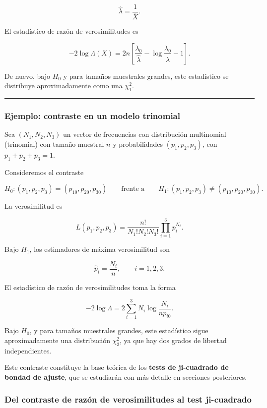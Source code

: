 \documentclass[
]{article}
\begin{document}
\[
\hat\lambda=\frac{1}{\bar X}.
\]

El estadístico de razón de verosimilitudes es

\[
-2\log\Lambda(X)
=
2n\left[
\frac{\lambda_0}{\hat\lambda}
-\log\frac{\lambda_0}{\hat\lambda}
-1
\right].
\]

De nuevo, bajo \(H_0\) y para tamaños muestrales grandes, este estadístico se distribuye aproximadamente como una \(\chi^2_1\).

\begin{center}\rule{0.5\linewidth}{0.5pt}\end{center}

\subsubsection{Ejemplo: contraste en un modelo trinomial}\label{ejemplo-contraste-en-un-modelo-trinomial}

Sea \((N_1,N_2,N_3)\) un vector de frecuencias con distribución multinomial (trinomial) con tamaño muestral \(n\) y probabilidades \((p_1,p_2,p_3)\), con \(p_1+p_2+p_3=1\).

Consideremos el contraste

\[
H_0:(p_1,p_2,p_3)=(p_{10},p_{20},p_{30})
\qquad \text{frente a} \qquad
H_1:(p_1,p_2,p_3)\neq(p_{10},p_{20},p_{30}).
\]

La verosimilitud es

\[
L(p_1,p_2,p_3)
=
\frac{n!}{N_1!N_2!N_3!}
\prod_{i=1}^3 p_i^{N_i}.
\]

Bajo \(H_1\), los estimadores de máxima verosimilitud son

\[
\hat p_i=\frac{N_i}{n},
\qquad i=1,2,3.
\]

El estadístico de razón de verosimilitudes toma la forma

\[
-2\log\Lambda
=
2\sum_{i=1}^3 N_i\log\frac{N_i}{n p_{i0}}.
\]

Bajo \(H_0\), y para tamaños muestrales grandes, este estadístico sigue aproximadamente una distribución \(\chi^2_2\), ya que hay dos grados de libertad independientes.

Este contraste constituye la base teórica de los \textbf{tests de ji-cuadrado de bondad de ajuste}, que se estudiarán con más detalle en secciones posteriores.

\subsubsection{Del contraste de razón de verosimilitudes al test ji-cuadrado}\label{del-contraste-de-razuxf3n-de-verosimilitudes-al-test-ji-cuadrado}
\end{document}

